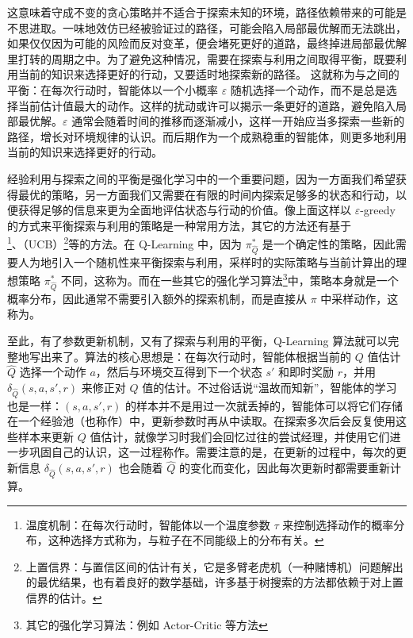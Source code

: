 这意味着守成不变的贪心策略并不适合于探索未知的环境，路径依赖带来的可能是不思进取。一味地效仿已经被验证过的路径，可能会陷入局部最优解而无法跳出，如果仅仅因为可能的风险而反对变革，便会堵死更好的道路，最终掉进局部最优解里打转的周期之中。为了避免这种情况，需要在探索与利用之间取得平衡，既要利用当前的知识来选择更好的行动，又要适时地探索新的路径。
这就称为与之间的平衡：在每次行动时，智能体以一个小概率 $\varepsilon$ 随机选择一个动作，而不是总是选择当前估计值最大的动作。这样的扰动或许可以揭示一条更好的道路，避免陷入局部最优解。$\varepsilon$ 通常会随着时间的推移而逐渐减小，这样一开始应当多探索一些新的路径，增长对环境规律的认识。而后期作为一个成熟稳重的智能体，则更多地利用当前的知识来选择更好的行动。

经验利用与探索之间的平衡是强化学习中的一个重要问题，因为一方面我们希望获得最优的策略，另一方面我们又需要在有限的时间内探索足够多的状态和行动，以便获得足够的信息来更为全面地评估状态与行动的价值。像上面这样以 $\varepsilon$-greedy 的方式来平衡探索与利用的策略是一种常用方法，其它的方法还有基于\footnote{温度机制：在每次行动时，智能体以一个温度参数 $\tau$ 来控制选择动作的概率分布，这种选择方式称为，与粒子在不同能级上的分布有关。}、（UCB）\footnote{上置信界：与置信区间的估计有关，它是多臂老虎机（一种赌博机）问题解出的最优结果，也有着良好的数学基础，许多基于树搜索的方法都依赖于对上置信界的估计。}等的方法。在 Q-Learning 中，因为 $\pi^*_{\hat Q}$ 是一个确定性的策略，因此需要人为地引入一个随机性来平衡探索与利用，采样时的实际策略与当前计算出的理想策略 $\pi^*_{\hat Q}$ 不同，这称为。而在一些其它的强化学习算法\footnote{其它的强化学习算法：例如 Actor-Critic 等方法}中，策略本身就是一个概率分布，因此通常不需要引入额外的探索机制，而是直接从 $\pi$ 中采样动作，这称为。

至此，有了参数更新机制，又有了探索与利用的平衡，Q-Learning 算法就可以完整地写出来了。算法的核心思想是：在每次行动时，智能体根据当前的 $Q$ 值估计 $\hat Q$ 选择一个动作 $a$，然后与环境交互得到下一个状态 $s'$ 和即时奖励 $r$，并用 $\delta_{\hat Q} (s, a, s', r)$ 来修正对 $Q$ 值的估计。不过俗话说“温故而知新”，智能体的学习也是一样：$(s, a, s', r)$ 的样本并不是用过一次就丢掉的，智能体可以将它们存储在一个经验池（也称作）中，更新参数时再从中读取。在探索多次后会反复使用这些样本来更新 $Q$ 值估计，就像学习时我们会回忆过往的尝试经理，并使用它们进一步巩固自己的认识，这一过程称作。需要注意的是，在更新的过程中，每次的更新信息 $\delta_{\hat Q} (s, a, s', r)$ 也会随着 $\hat Q$ 的变化而变化，因此每次更新时都需要重新计算。

